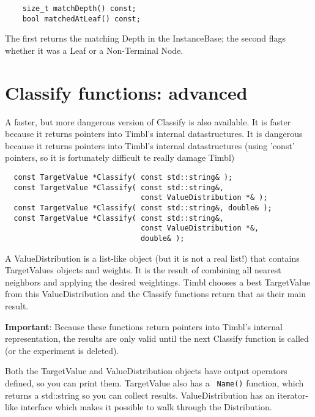 \documentclass{report}
\begin{document}
\begin{footnotesize}
\begin{verbatim}
    size_t matchDepth() const;
    bool matchedAtLeaf() const;
\end{verbatim}
\end{footnotesize}

The first returns the matching Depth in the InstanceBase; the second 
flags whether it was a Leaf or a Non-Terminal Node.

\section{Classify functions: advanced}

A faster, but more dangerous version of Classify is also available.
It is faster because it returns pointers into Timbl's internal
datastructures. It is dangerous because it returns pointers into
Timbl's internal datastructures (using 'const' pointers, so it is
fortunately difficult te really damage Timbl)

\begin{footnotesize}
\begin{verbatim}
  const TargetValue *Classify( const std::string& );
  const TargetValue *Classify( const std::string&, 
                               const ValueDistribution *& );
  const TargetValue *Classify( const std::string&, double& );
  const TargetValue *Classify( const std::string&, 
                               const ValueDistribution *&, 
                               double& );
\end{verbatim}
\end{footnotesize}

A ValueDistribution is a list-like object (but it is not a real list!)
that contains TargetValues objects and weights. It is the result of
combining all nearest neighbors and applying the desired weightings.
Timbl chooses a best TargetValue from this ValueDistribution and the
Classify functions return that as their main result.

{\bf Important}: Because these functions return pointers into Timbl's
internal representation, the results are only valid until the next
Classify function is called (or the experiment is deleted).

Both the TargetValue and ValueDistribution objects have output
operators defined, so you can print them.  TargetValue also has a {\tt
  Name()} function, which returns a std::string so you can collect
results.  ValueDistribution has an iterator-like interface which makes
it possible to walk through the Distribution.
\end{document}
